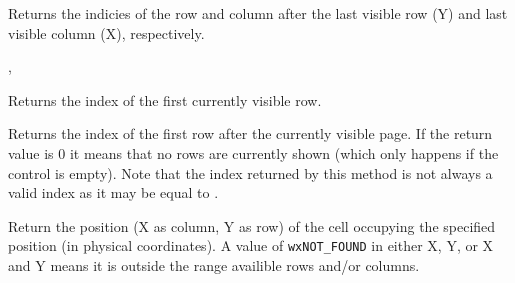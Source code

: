 \label{wxhvscrolledwindowgetvisiblebegin}


Returns the indicies of the row and column after the last visible row (Y) and
last visible column (X), respectively.


, 


\label{wxhvscrolledwindowgetvisiblerowsbegin}


Returns the index of the first currently visible row.




\label{wxhvscrolledwindowgetvisiblerowsend}


Returns the index of the first row after the currently visible page. If the
return value is $0$ it means that no rows are currently shown (which only
happens if the control is empty). Note that the index returned by this method
is not always a valid index as it may be equal to 
.




\label{wxhvscrolledwindowhittest}



Return the position (X as column, Y as row) of the cell occupying the specified
position (in physical coordinates). A value of {\tt wxNOT\_FOUND} in either X,
Y, or X and Y means it is outside the range availible rows and/or columns.


\label{wxhvscrolledwindowiscolumnvisible}


